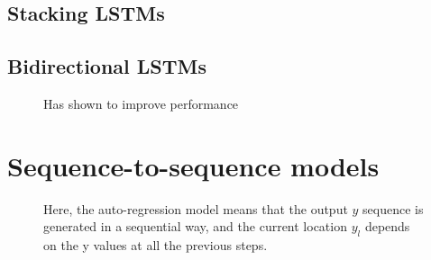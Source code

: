 \documentclass[11pt]{article}
\begin{document}
\subsection{Stacking LSTMs}

\begin{figure}[H]
    \centering
\end{figure}

\subsection{Bidirectional LSTMs}

\begin{figure}[H]
    \centering
    \caption*{Has shown to improve performance}
\end{figure}

\section{Sequence-to-sequence models}

\begin{figure}[H]
    \centering
    \caption*{Here, the auto-regression model means that the output $y$ sequence is generated in a sequential way, and the current location $y_l$ depends on the y values at all the previous steps.}
\end{figure}
\end{document}
